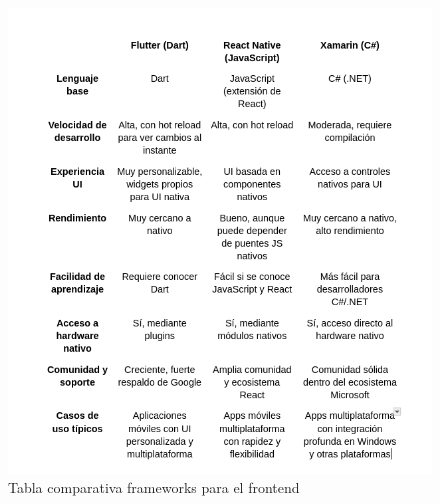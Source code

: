 \begin{figure}[H]
   \centering
    \includegraphics[width=\textwidth]{tablas/Frontend.png}
    \caption{Tabla comparativa frameworks para el frontend}
    \label{fig:Tabla frontend}
\end{figure} 